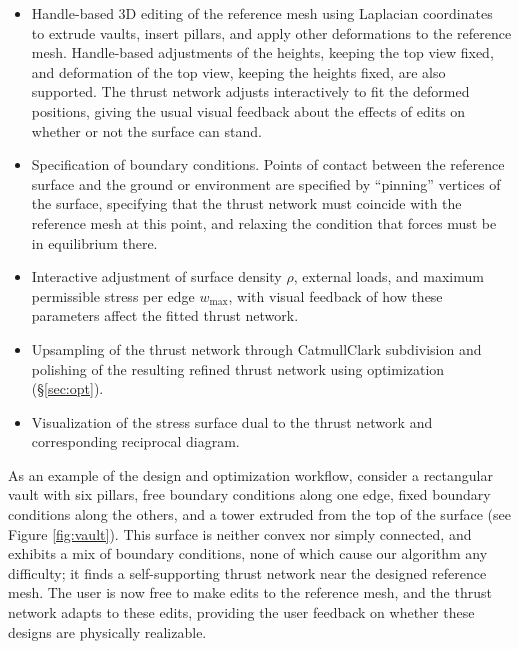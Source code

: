 \documentclass[review]{acmsiggraph}
\newcommand{\secref}[1]{(\S\ref{#1})}
\begin{document}
\begin{itemize}\itemsep-\parsep

\item Handle-based 3D editing of the reference mesh using Laplacian
coordinates~\cite{Lipman2004,Sorkine2003} to extrude vaults, insert
pillars, and apply other deformations to the reference mesh. Handle-based
adjustments of the heights, keeping the top view fixed, and deformation of
the top view, keeping the heights fixed, are also supported. The thrust
network adjusts interactively to fit the deformed positions, giving the
usual visual feedback about the effects of edits on whether or not the
surface can stand.

\item Specification of boundary conditions. Points of contact between the
reference surface and the ground or environment are specified by
``pinning'' vertices of the surface, specifying that the thrust network
must coincide with the reference mesh at this point, and relaxing the
condition that forces must be in equilibrium there.

\item Interactive adjustment of surface density $\rho$, external loads,
and maximum permissible stress per edge $w_{\textrm{max}}$, with visual
feedback of how these parameters affect the fitted thrust network.

\item Upsampling of the thrust network through Catmull\dash Clark
subdivision 
and polishing of the resulting refined thrust
network using optimization \secref{sec:opt}.

\item Visualization of the stress surface dual to the thrust network
and corresponding reciprocal diagram.

\end{itemize}



\def\sparagraph#1{\par\noindent{\it #1}}

\sparagraph{{\sf\bfseries Examples.} Vault with Pillars:}
As an example of the design and
optimization workflow, consider a rectangular vault with six pillars, free
boundary conditions along one edge, fixed boundary conditions along the
others, and a tower extruded from the top of the surface (see Figure
\ref{fig:vault}). This surface is neither convex nor simply connected, and
exhibits a mix of boundary conditions, none of which cause our algorithm
any difficulty; it finds a self-supporting thrust network near the
designed reference mesh. The user is now free to make edits to the
reference mesh, and the thrust network adapts to these edits, providing
the user feedback on whether these designs are physically realizable.
\end{document}
